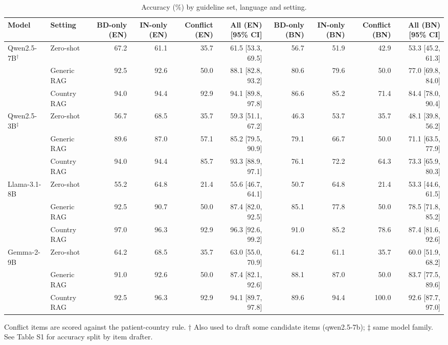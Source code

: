 \begin{table}[t]
\centering
\footnotesize
\caption{Accuracy (\%) by guideline set, language and setting.}
\label{tab:acc}
\begin{tabular}{llrrrrrrrr}
\toprule
Model & Setting & BD-only (EN) & IN-only (EN) & Conflict (EN) & All (EN) [95\% CI] & BD-only (BN) & IN-only (BN) & Conflict (BN) & All (BN) [95\% CI] \\
\midrule
Qwen2.5-7B$^\dagger$ & Zero-shot & 67.2 & 61.1 & 35.7 & 61.5 [53.3, 69.5] & 56.7 & 51.9 & 42.9 & 53.3 [45.2, 61.3] \\
 & Generic RAG & 92.5 & 92.6 & 50.0 & 88.1 [82.8, 93.2] & 80.6 & 79.6 & 50.0 & 77.0 [69.8, 84.0] \\
 & Country RAG & 94.0 & 94.4 & 92.9 & 94.1 [89.8, 97.8] & 86.6 & 85.2 & 71.4 & 84.4 [78.0, 90.4] \\
\addlinespace
Qwen2.5-3B$^\ddagger$ & Zero-shot & 56.7 & 68.5 & 35.7 & 59.3 [51.1, 67.2] & 46.3 & 53.7 & 35.7 & 48.1 [39.8, 56.2] \\
 & Generic RAG & 89.6 & 87.0 & 57.1 & 85.2 [79.5, 90.9] & 79.1 & 66.7 & 50.0 & 71.1 [63.5, 77.9] \\
 & Country RAG & 94.0 & 94.4 & 85.7 & 93.3 [88.9, 97.1] & 76.1 & 72.2 & 64.3 & 73.3 [65.9, 80.3] \\
\addlinespace
Llama-3.1-8B & Zero-shot & 55.2 & 64.8 & 21.4 & 55.6 [46.7, 64.1] & 50.7 & 64.8 & 21.4 & 53.3 [44.6, 61.5] \\
 & Generic RAG & 92.5 & 90.7 & 50.0 & 87.4 [82.0, 92.5] & 85.1 & 77.8 & 50.0 & 78.5 [71.8, 85.2] \\
 & Country RAG & 97.0 & 96.3 & 92.9 & 96.3 [92.6, 99.2] & 91.0 & 85.2 & 78.6 & 87.4 [81.6, 92.6] \\
\addlinespace
Gemma-2-9B & Zero-shot & 64.2 & 68.5 & 35.7 & 63.0 [55.0, 70.9] & 64.2 & 61.1 & 35.7 & 60.0 [51.9, 68.2] \\
 & Generic RAG & 91.0 & 92.6 & 50.0 & 87.4 [82.1, 92.6] & 88.1 & 87.0 & 50.0 & 83.7 [77.5, 89.6] \\
 & Country RAG & 92.5 & 96.3 & 92.9 & 94.1 [89.7, 97.8] & 89.6 & 94.4 & 100.0 & 92.6 [87.7, 97.0] \\
\bottomrule
\end{tabular}
\par\smallskip\parbox{\linewidth}{\scriptsize Conflict items are scored against the patient-country rule. † Also used to draft some candidate items (qwen2.5-7b); ‡ same model family. See Table S1 for accuracy split by item drafter.}
\end{table}


